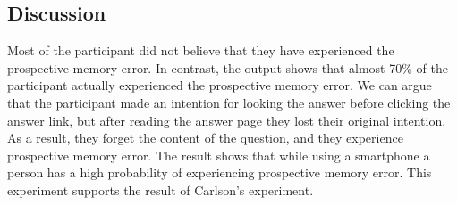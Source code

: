 \subsection{Discussion}

Most of the participant did not believe that they have experienced the prospective memory error. In contrast, the output shows that  almost 70\% of the participant actually experienced the prospective memory error.
We can argue that the participant made an intention for looking the answer before clicking the answer link, but after reading the answer page
they lost their original intention.
As a result, they forget the content of the question, and they experience prospective memory error.
The result shows that while using a smartphone a person has a high probability of experiencing prospective memory error.
This experiment supports the result of Carlson's experiment.



